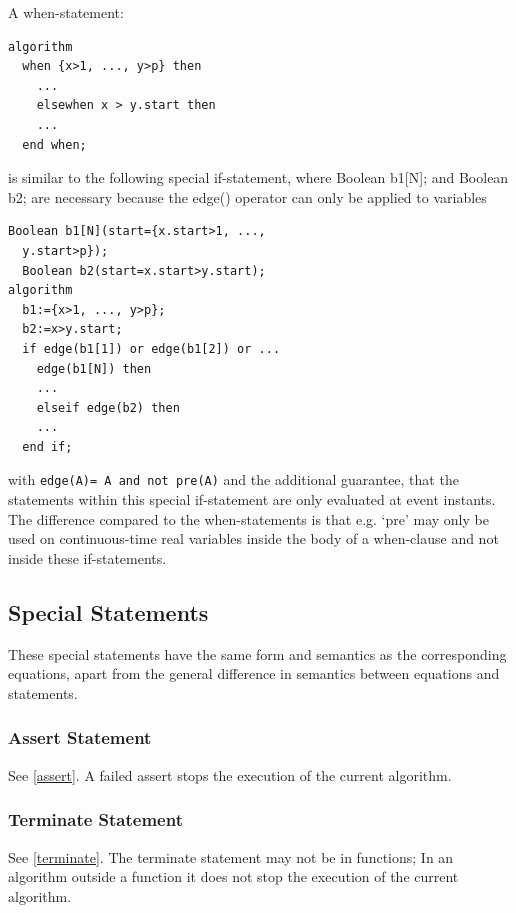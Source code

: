 \documentclass[10pt,a4paper]{report}
\def\doublelabel#1{\label{#1}}
\begin{document}
A when-statement:

\begin{lstlisting}[language=modelica]
algorithm
  when {x>1, ..., y>p} then
    ...
    elsewhen x > y.start then
    ...
  end when;
\end{lstlisting}
is similar to the following special if-statement, where Boolean
  b1{[}N{]}; and Boolean b2; are necessary because the edge() operator can
only be applied to variables

\begin{lstlisting}[language=modelica]
  Boolean b1[N](start={x.start>1, ...,
  y.start>p});
  Boolean b2(start=x.start>y.start);
algorithm
  b1:={x>1, ..., y>p};
  b2:=x>y.start;
  if edge(b1[1]) or edge(b1[2]) or ...
    edge(b1[N]) then 
    ...
    elseif edge(b2) then
    ...
  end if;
\end{lstlisting}
  with \lstinline!edge(A)= A and not pre(A)! and the additional guarantee, that the
  statements within this special if-statement are only evaluated at event
  instants. The difference compared to the when-statements is that e.g.
`pre' may only be used on continuous-time real variables inside the body
of a when-clause and not inside these if-statements.

\subsection{Special Statements}\doublelabel{special-statements}

These special statements have the same form and semantics as the
corresponding equations, apart from the general difference in semantics
between equations and statements.

\subsubsection{Assert Statement}\doublelabel{assert-statement}

See \ref{assert}. A failed assert stops the execution of the current
algorithm.

\subsubsection{Terminate Statement}\doublelabel{terminate-statement}

See \ref{terminate}. The terminate statement may not be in functions; In
an algorithm outside a function it does not stop the execution of the
current algorithm.
\end{document}
